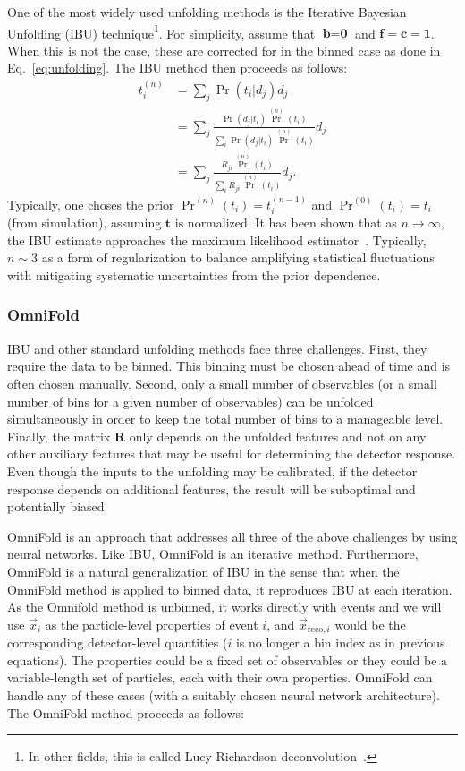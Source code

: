 One of the most widely used unfolding methods is the Iterative Bayesian Unfolding (IBU) technique\footnote{In other fields, this is called Lucy-Richardson deconvolution~\cite{1974AJ.....79..745L,Richardson:72}.}.   For simplicity, assume that $\textbf{b}=\textbf{0}$ and $\textbf{f}=\textbf{c}=\textbf{1}$.  When this is not the case, these are corrected for in the binned case as done in Eq.~\ref{eq:unfolding}.   The IBU method then proceeds as follows:
\begin{align}
t_i^{(n)}&=\sum_j \Pr(t_i|d_j) d_j \\
&=\sum_j \frac{\Pr(d_j|t_i)\Pr^{(n)}(t_i)}{\sum_i \Pr(d_j|t_i)\Pr^{(n)}(t_i)} d_j \\
&=\sum_j \frac{R_{ji}\Pr^{(n)}(t_i)}{\sum_i R_{ji}\Pr^{(n)}(t_i)} d_j.
\end{align}
%
Typically, one choses the prior $\Pr^{(n)}(t_i)=t_i^{(n-1)}$ and $\Pr^{(0)}(t_i)=t_i$ (from simulation), assuming $\textbf{t}$ is normalized.  It has been shown that as $n\rightarrow\infty$, the IBU estimate approaches the maximum likelihood estimator~\cite{shepp1982maximum}.  Typically, $n\sim 3$ as a form of regularization to balance amplifying statistical fluctuations with mitigating systematic uncertainties from the prior dependence.

\subsubsection{OmniFold}
\label{subsec:omnifold}

IBU and other standard unfolding methods face three challenges.  First, they require the data to be binned.  This binning must be chosen ahead of time and is often chosen manually.  Second, only a small number of observables (or a small number of bins for a given number of observables) can be unfolded simultaneously in order to keep the total number of bins to a manageable level.  Finally, the matrix $\textbf{R}$ only depends on the unfolded features and not on any other auxiliary features that may be useful for determining the detector response.  Even though the inputs to the unfolding may be calibrated, if the detector response depends on additional features, the result will be suboptimal and potentially biased.

OmniFold is an approach that addresses all three of the above challenges by using neural networks.  Like IBU, OmniFold is an iterative method.  Furthermore, OmniFold is a natural generalization of IBU in the sense that when the OmniFold method is applied to binned data, it reproduces IBU at each iteration.
As the Omnifold method is unbinned, it works directly with events and we will use $\vec{x}_i$ as the particle-level properties of event $i$, and $\vec{x}_{\mathrm{reco},i}$ would be the corresponding detector-level quantities ($i$ is no longer a bin index as in previous equations).  The properties could be a fixed set of observables or they could be a variable-length set of particles, each with their own properties.  OmniFold can handle any of these cases (with a suitably chosen neural network architecture).
The OmniFold method proceeds as follows:

